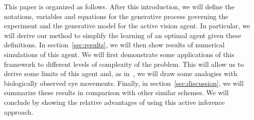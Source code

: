 This paper is organized as follows. After this introduction, we will define the notations, variables and equations for the generative process governing the experiment and the generative model for the active vision agent. In particular, we will derive our method to simplify the learning of an optimal agent given these definitions. In section~\ref{sec:results}, we will then show results of numerical simulations of this agent. We will first demonstrate some applications of this framework to different levels of complexity of the problem. This will allow us to derive some limits of this agent and, as in~\citep{Najemnik05}, we will draw some analogies with biologically observed eye movements. Finally, in section~\ref{sec:discussion}, we will summarize these results in comparison with other similar schemes. We will conclude by showing the relative advantages of using this active inference approach.
